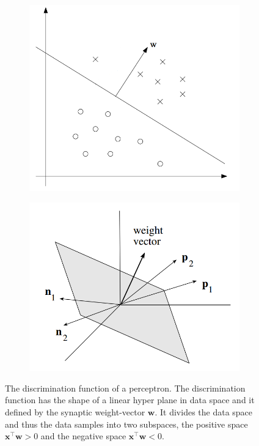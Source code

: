 \begin{figure}
	\centering
	\begin{subfigure}[t]{.45\textwidth}
	 	\centering
  		\includegraphics[width=.9\linewidth]{imgs/percept_discr1.png}
	\end{subfigure}
	\begin{subfigure}[t]{.45\textwidth}
	 	\centering
  		\includegraphics[width=.9\linewidth]{imgs/percept_discr2.png}
	\end{subfigure}
    \caption{The discrimination function of a perceptron. The discrimination function has the shape of a linear hyper plane in data space and it defined by the synaptic weight-vector $\textbf{w}$. It divides the data space and thus the data samples into two subspaces, the positive space $\textbf{x}^{\intercal}\textbf{w} > 0$ and the negative space $\textbf{x}^{\intercal}\textbf{w} < 0$.}
	\label{fig:discrimation}
\end{figure}


